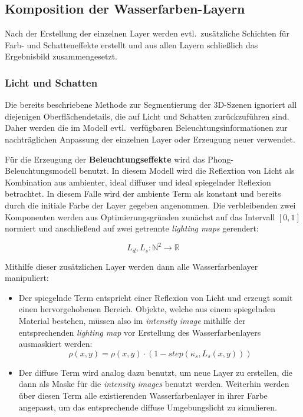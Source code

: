 \subsection{Komposition der Wasserfarben-Layern}
Nach der Erstellung der einzelnen Layer werden evtl.\ zusätzliche Schichten für
Farb- und Schatteneffekte erstellt und aus allen Layern schließlich das
Ergebnisbild zusammengesetzt.

\subsubsection{Licht und Schatten}
Die bereits beschriebene Methode zur Segmentierung der 3D-Szenen ignoriert
all diejenigen Oberflächendetails, die auf Licht und Schatten zurückzuführen
sind. Daher werden die im Modell evtl.\ verfügbaren Beleuchtungsinformationen
zur nachträglichen Anpassung der einzelnen Layer oder Erzeugung neuer verwendet.

Für die Erzeugung der \textbf{Beleuchtungseffekte} wird das 
Phong-Beleuchtungsmodell \cite{Phong1975} benutzt. In diesem Modell wird die 
Reflextion von Licht als Kombination aus ambienter, ideal diffuser und ideal 
spiegelnder Reflexion betrachtet. In diesem Falle wird der ambiente Term als 
konstant und bereits durch die initiale Farbe der Layer gegeben angenommen. Die 
verbleibenden zwei Komponenten werden aus Optimierungsgründen zunächst auf das 
Intervall $[0,1]$ normiert und anschließend auf zwei getrennte \textsl{lighting 
maps} gerendert:

\[
L_d, L_s : \mathbb{N}^2 \to \mathbb{R}
\]

Mithilfe dieser zusätzlichen Layer werden dann alle Wasserfarbenlayer
manipuliert:

\begin{itemize}
  \item Der spiegelnde Term entspricht einer Reflexion von Licht und erzeugt
  somit einen hervorgehobenen Bereich. Objekte, welche aus einem spiegelnden
  Material bestehen, müssen also im \textsl{intensity image} mithilfe der
  entsprechenden \textsl{lighting map} vor Erstellung des Wasserfarbenlayers 
  ausmaskiert werden: 
  \[
  \rho(x,y) = \rho(x,y) \cdot (1- step(\kappa_s, L_s(x,y)))
  \]
  \item Der diffuse Term wird analog dazu benutzt, um neue Layer zu erstellen,
  die dann als Maske für die \textsl{intensity images} benutzt werden. Weiterhin
  werden über diesen Term alle existierenden Wasserfarbenlayer in ihrer Farbe
  angepasst, um das entsprechende diffuse Umgebungslicht zu simulieren.
\end{itemize}

